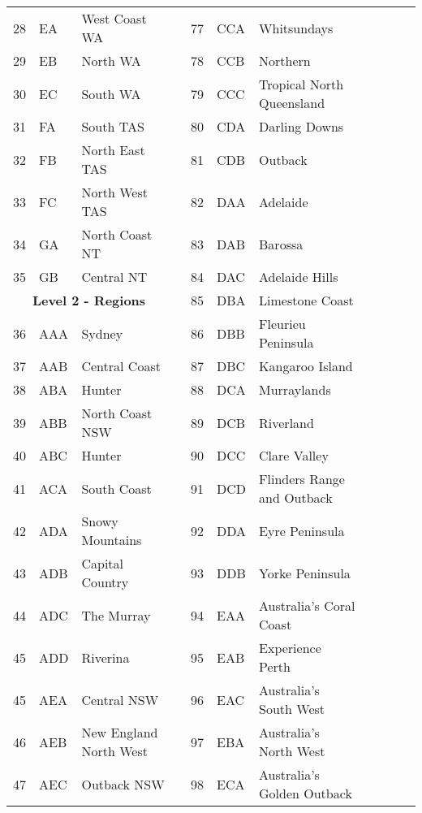 \begin{table}[H]
{\begin{tabular}{lllllllllll}
				28	& EA & West Coast WA 	& & 77  & CCA & Whitsundays &&&&\\	
				29	& EB & North WA			& & 78  & CCB & Northern &&&&\\	
				30	& EC & South WA 		& & 79  & CCC & Tropical North Queensland &&&&\\	
				31	& FA & South TAS		& & 80  & CDA & Darling Downs &&&&\\
				32	& FB & North East TAS	& & 81  & CDB & Outback &&&&\\	
				33	& FC & North West TAS	& & 82  & DAA & Adelaide &&&&\\
				34	& GA & North Coast NT	& & 83  & DAB & Barossa &&&&\\
				35	& GB & Central NT		& & 84  & DAC & Adelaide Hills &&&&\\
				\cmidrule(lr){1-3}
				\multicolumn{3}{c}{\textbf{Level 2 - Regions}} & & 85  & DBA & Limestone Coast &&&&\\
				\cmidrule(lr){1-3}
				36	& AAA & Sydney 			& 	& 86  & DBB & Fleurieu Peninsula &&&&\\
				37	& AAB & Central Coast	&	& 87  & DBC & Kangaroo Island &&&&\\
				38  & ABA & Hunter 			& 	& 88  & DCA & Murraylands &&&&\\
				39  & ABB & North Coast NSW & 	& 89  & DCB & Riverland &&&&\\
				40  & ABC & Hunter			& 	& 90  & DCC & Clare Valley &&&&\\
				41  & ACA & South Coast		& 	& 91  & DCD & Flinders Range and Outback &&&&\\
				42  & ADA & Snowy Mountains & 	& 92  & DDA & Eyre Peninsula &&&&\\
				43  & ADB & Capital Country & 	& 93  & DDB & Yorke Peninsula &&&&\\
				44  & ADC & The Murray 		& 	& 94  & EAA & Australia's Coral Coast &&&&\\
				45  & ADD & Riverina 		& 	& 95  & EAB & Experience Perth &&&&\\
				45  & AEA & Central NSW 	& 	& 96  & EAC & Australia's South West &&&&\\
				46  & AEB & New England North West &  & 97  & EBA & Australia's North West &&&&\\
				47  & AEC & Outback NSW & & 98  & ECA & Australia's Golden Outback &&&&\\
				\bottomrule
			\end{tabular}
		}
\end{table}

